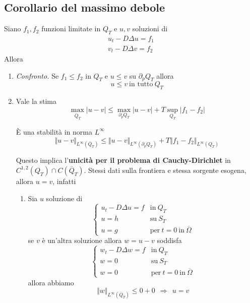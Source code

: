 \documentclass[10pt,a4paper,twoside,openright]{book}
\begin{document}
\subsection{Corollario del massimo debole}

Siano $f_{1},f_{2}$ funzioni limitate in $Q_{T}$ e $u,v$ soluzioni di
\begin{gather*}
u_{t} -D\Delta u=f_{1}\\
v_{t} -D\Delta v=f_{2}
\end{gather*}
Allora
\begin{enumerate}
\item \textit{Confronto.} Se $f_{1} \leqslant f_{2}$ in $Q_{T}$ e $u\leqslant v$ su $\partial _{p} Q_{T}$ allora\begin{equation*}
u\leqslant v\ \text{in tutto} \ Q_{T}
\end{equation*}
\item Vale la stima\begin{equation*}
\max_{\overline{Q}_{T}}| u-v| \leqslant \max_{\partial _{p} Q_{T}}| u-v| +T\sup _{Q_{T}}| f_{1} -f_{2}| 
\end{equation*}

È una stabilità in norma $L^{\infty }$\begin{equation*}
\Vert u-v\Vert _{L^{\infty }(\overline{Q}_{T})} \leqslant \Vert u-v\Vert _{L^{\infty }( \partial _{p} Q_{T})} +T\Vert f_{1} -f_{2}\Vert _{L^{\infty }(Q_{T})}
\end{equation*}

Questo implica l'\textbf{unicità per il problema di Cauchy-Dirichlet} in $C^{1,2}(Q_{T}) \cap C(\overline{Q}_{T})$. Stessi dati sulla frontiera e stessa sorgente esogena, allora $u=v$, infatti
\begin{enumerate}
\item Sia $u$ soluzione di\begin{equation*}
\begin{cases}
u_{t} -D\Delta u=f & \text{in} \ Q_{T}\\
u=h & \text{su} \ S_{T}\\
u=g & \text{per} \ t=0\ \text{in} \ \overline{\Omega }
\end{cases}
\end{equation*}se $v$ è un'altra soluzione allora $w=u-v$ soddisfa\begin{equation*}
\begin{cases}
w_{t} -D\Delta w=f & \text{in} \ Q_{T}\\
w=0 & \text{su} \ S_{T}\\
w=0 & \text{per} \ t=0\ \text{in} \ \overline{\Omega }
\end{cases}
\end{equation*}allora abbiamo\begin{equation*}
\Vert w\Vert _{L^{\infty }(\overline{Q}_{T})} \leqslant 0+0\ \ \Rightarrow \ \ u=v
\end{equation*}
\end{enumerate}
\end{enumerate}
\end{document}
